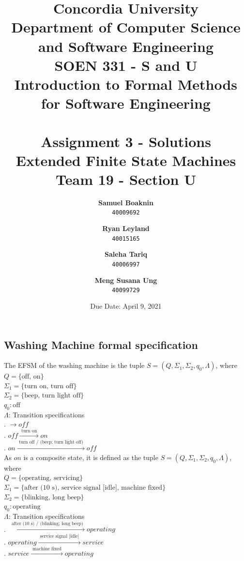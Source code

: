 \documentclass[12pt]{article}
\title{Concordia University\\
Department of Computer Science and Software Engineering\\
\textbf{SOEN 331 - S and U\\Introduction to Formal Methods\\for Software Engineering}\\
\ \\
\textbf{Assignment 3 - Solutions}\\
Extended Finite State Machines\\
\textbf{Team 19 - Section U}}
\author{
	\textbf{Samuel Boaknin}\\
	\texttt{40009692}
	\and
	\textbf{Ryan Leyland}\\
	\texttt{40015165}
	\and
	\textbf{Saleha Tariq}\\
	\texttt{40006997}
	\and
	\textbf{Meng Susana Ung}\\
	\texttt{40099729}
}
\date{Due Date: April 9, 2021}
\begin{document}
\begin{spacing}{1.5}

\maketitle

\section{Washing Machine formal specification}

\noindent The EFSM of the washing machine is the tuple $S = (Q, \Sigma_1, \Sigma_2, q_0, \Lambda)$, where\\
\noindent $Q = \{\text {off, on}\}$\\
\noindent $\Sigma_1 = \{\text {turn on, turn off}\}$\\
\noindent $\Sigma_2 = \{\text {beep, turn light off}\}$\\
\noindent $q_0: \text{off}$\\
\noindent $\Lambda$: Transition specifications\\
. $\rightarrow off $\\
. $off \xrightarrow {\text { turn on }} on$\\
. $on \xrightarrow {\text { turn off / (beep; turn light off) }} off$\\

\noindent As $on$ is a composite state, it is defined as the tuple $S = (Q, \Sigma_1, \Sigma_2, q_0, \Lambda)$, where\\
\noindent $Q = \{\text {operating, servicing}\}$\\
\noindent $\Sigma_1 = \{\text {after (10 s), service signal [idle], machine fixed}\}$\\
\noindent $\Sigma_2 = \{\text {blinking, long beep}\}$\\
\noindent $q_0: \text{operating}$\\
\noindent $\Lambda$: Transition specifications\\
. $\xrightarrow {\text { after (10 s) / (blinking; long beep) }} operating$\\
. $operating \xrightarrow {\text { service signal [idle] }} service$\\
. $service \xrightarrow {\text { machine fixed }} operating$\\
\newpage


\end{spacing}
\end{document}
